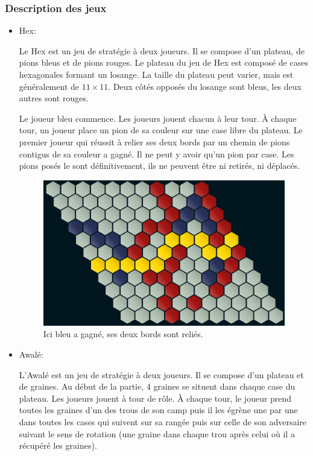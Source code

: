 \subsubsection{Description des jeux}
\begin{itemize}
    \item Hex:
    
    Le Hex est un jeu de stratégie à deux joueurs. Il se compose d'un plateau, de pions bleus
    et de pions rouges. Le plateau du jeu de Hex est composé de cases hexagonales formant un losange. La taille
    du plateau peut varier, mais est généralement de $11\times 11$. Deux côtés opposés du losange sont bleus, les deux 
    autres sont rouges. 

    Le joueur bleu commence. Les joueurs jouent chacun à leur tour. À chaque tour, un joueur place un pion de sa couleur sur une 
    case libre du plateau. Le premier joueur qui réussit à relier ses deux bords par un chemin de pions contigus de sa couleur
    a gagné. Il ne peut y avoir qu'un pion par case. Les pions posés le sont définitivement, ils ne peuvent être ni retirés, ni
    déplacés.\\

    \begin{figure}[!htb]
        \begin{center}
            \includegraphics[scale=0.5]{root/hex_jeu_bleu}
        \end{center}
        \caption{Ici bleu a gagné, ses deux bords sont reliés.}\label{fig:hex_jeu_bleu}
    \end{figure}
    

    \item Awalé:
    
    L'Awalé est un jeu de stratégie à deux joueurs. Il se compose d'un plateau et de graines. Au début de la partie, 4 graines se 
    situent dans chaque case du plateau. Les joueurs jouent à tour de rôle. À chaque tour, le joueur prend toutes les graines d’un 
    des trous de son camp puis il les égrène une par une dans toutes les cases qui suivent sur sa rangée puis sur celle de son adversaire 
    suivant le sens de rotation (une graine dans chaque trou après celui où il a récupéré les graines).


\end{itemize}
